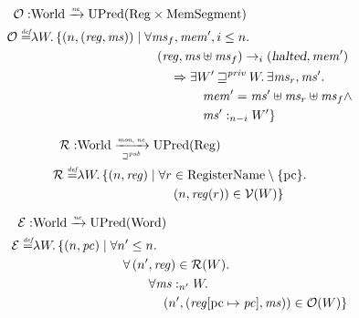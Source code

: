 \documentclass[a4paper]{article}
\newcommand{\update}[2]{[#1 \mapsto #2]}
\newcommand{\nefun}{\xrightarrow{\textit{\tiny{ne}}}}
\newcommand{\defeq}{\stackrel{\textit{\tiny{def}}}{=}}
\newcommand{\var}[1]{\mathit{#1}}
\newcommand{\hs}{\var{ms}}
\newcommand{\ms}{\hs}
\newcommand{\pc}{\mathit{pc}}
\newcommand{\pcreg}{\mathrm{pc}}
\newcommand{\reg}{\var{reg}}
\newcommand{\heap}{\var{mem}}
\newcommand{\halted}{\textsl{halted}}
\newcommand{\futurewk}{\mathbin{\sqsupseteq}^{\var{pub}}}
\newcommand{\futurestr}{\mathbin{\sqsupseteq}^{\var{priv}}}
\newcommand{\heapSat}[3][\heap]{#1 :_{#2} #3}
\newcommand{\monwknefun}{\xrightarrow[\text{\tiny{$\futurewk$}}]{\textit{\tiny{mon, ne}}}}
\newcommand{\asmType}{\plaindom{AsmType}}
\newcommand{\plaindom}[1]{\mathrm{#1}}
\newcommand{\Words}{\plaindom{Word}}
\newcommand{\RegName}{\plaindom{RegisterName}}
\newcommand{\Regs}{\plaindom{Reg}}
\newcommand{\HeapSegments}{\plaindom{MemSegment}}
\newcommand{\Worlds}{\plaindom{World}}
\newcommand{\UPred}[1]{\plaindom{UPred}(#1)}
\newcommand{\intr}[2]{\mathcal{#1}}
\newcommand{\valueintr}[1]{\intr{V}{#1}}
\newcommand{\exprintr}[1]{\intr{E}{#1}}
\newcommand{\regintr}[1]{\intr{R}{#1}}
\newcommand{\stdvr}{\valueintr{\asmType}}
\newcommand{\stder}{\exprintr{\asmType}}
\newcommand{\stdrr}{\regintr{\asmType}}
\newcommand{\observations}{\mathcal{O}}
\newcommand{\npair}[2][n]{\left(#1,#2 \right)}
\newcommand{\step}[1][]{\rightarrow_{#1}}
\begin{document}
\begin{align*}
  \observations : &  \Worlds \nefun \UPred{\Regs \times \HeapSegments} \\
  \observations \defeq & \lambda W \ldotp 
                             \{ \npair{(\reg,\hs)} \mid
                             \begin{aligned}[t]
                               & \forall \ms_f, \heap', i \leq n \ldotp \\
                               & \quad(\reg,\hs \uplus \ms_f) \step[i] (\halted,\heap')  \\
                               & \qquad \Rightarrow
                               \begin{aligned}[t]
                                 & \exists W' \futurestr W \ldotp\exists \hs_r, \hs' \ldotp\\
                                 & \quad \heap' = \hs' \uplus \hs_r \uplus \ms_f \land \\ 
                                 & \quad \heapSat[\hs']{n-i}{W'} \}
                               \end{aligned}
                             \end{aligned}
\end{align*}

\begin{align*}
  \stdrr : & \Worlds \monwknefun \UPred{\Regs} \\
  \stdrr \defeq & \lambda W \ldotp
                  \begin{aligned}[t]
                    \{ \npair{\reg} \mid & \;\forall r \in \RegName \setminus \{\pcreg\} \ldotp \\
                    & \;\quad  \npair{\reg(r)} \in \stdvr(W) \}
                  \end{aligned}
\end{align*}

\begin{align*}
  \stder : & \Worlds \nefun \UPred{\Words} \\
  \stder \defeq & \lambda W \ldotp \{ \npair{\pc} \mid 
                  \begin{aligned}[t]
                    & \forall n' \leq n \ldotp\\
                    & \quad \forall \npair[n']{\reg} \in \stdrr(W) \ldotp \\
                    & \quad \qquad  \forall \heapSat[\hs]{n'}{W} \ldotp \\
                    & \quad \qquad \quad \npair[n']{(\reg\update{\pcreg}{\pc},\hs)} \in \observations(W) \}
                  \end{aligned}
\end{align*}
\end{document}
